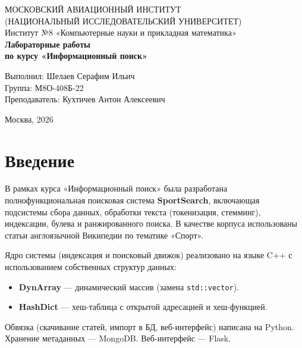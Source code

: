 \documentclass[a4paper,12pt]{article}
\begin{document}
\begin{titlepage}
    \centering
    {\fontsize{14pt}{16pt}\selectfont МОСКОВСКИЙ АВИАЦИОННЫЙ ИНСТИТУТ\\(НАЦИОНАЛЬНЫЙ ИССЛЕДОВАТЕЛЬСКИЙ УНИВЕРСИТЕТ)}\\[0.5cm]
    {\fontsize{12pt}{14pt}\selectfont Институт №8 «Компьютерные науки и прикладная математика»}\\[4cm]
    
    {\fontsize{16pt}{18pt}\selectfont \textbf{Лабораторные работы}}\\
    {\fontsize{14pt}{16pt}\selectfont \textbf{по курсу «Информационный поиск»}}\\[5cm]
    
    \vfill
    \begin{flushright}
        \begin{minipage}{0.51\textwidth}
            Выполнил: Шелаев Серафим Ильич\\
            Группа: М8О-408Б-22\\
            Преподаватель: Кухтичев Антон Алексеевич
        \end{minipage}
    \end{flushright}
    
    \vfill
    {\large Москва, 2026}
\end{titlepage}

\tableofcontents
\newpage

\section{Введение}
В рамках курса «Информационный поиск» была разработана полнофункциональная поисковая система \textbf{SportSearch}, включающая подсистемы сбора данных, обработки текста (токенизация, стемминг), индексации, булева и ранжированного поиска. В качестве корпуса использованы статьи англоязычной Википедии по тематике «Спорт».

Ядро системы (индексация и поисковый движок) реализовано на языке C++ с использованием собственных структур данных:
\begin{itemize}
    \item \textbf{DynArray} — динамический массив (замена \texttt{std::vector}).
    \item \textbf{HashDict} — хеш-таблица с открытой адресацией и хеш-функцией.
\end{itemize}
Обвязка (скачивание статей, импорт в БД, веб-интерфейс) написана на Python. Хранение метаданных — MongoDB. Веб-интерфейс — Flask.
\end{document}
